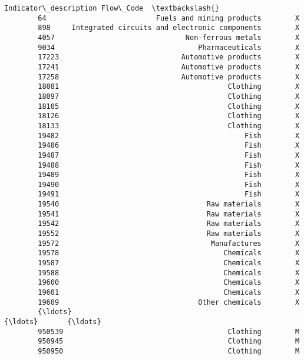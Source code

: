 \documentclass[11pt]{article}
\begin{document}
\begin{Verbatim}[commandchars=\\\{\}]
                                        Indicator\_description Flow\_Code  \textbackslash{}
        64                          Fuels and mining products        X    
        898     Integrated circuits and electronic components        X    
        4057                               Non-ferrous metals        X    
        9034                                  Pharmaceuticals        X    
        17223                             Automotive products        X    
        17241                             Automotive products        X    
        17258                             Automotive products        X    
        18081                                        Clothing        X    
        18097                                        Clothing        X    
        18105                                        Clothing        X    
        18126                                        Clothing        X    
        18133                                        Clothing        X    
        19482                                            Fish        X    
        19486                                            Fish        X    
        19487                                            Fish        X    
        19488                                            Fish        X    
        19489                                            Fish        X    
        19490                                            Fish        X    
        19491                                            Fish        X    
        19540                                   Raw materials        X    
        19541                                   Raw materials        X    
        19542                                   Raw materials        X    
        19552                                   Raw materials        X    
        19572                                    Manufactures        X    
        19578                                       Chemicals        X    
        19587                                       Chemicals        X    
        19588                                       Chemicals        X    
        19600                                       Chemicals        X    
        19601                                       Chemicals        X    
        19609                                 Other chemicals        X    
        {\ldots}                                               {\ldots}       {\ldots}   
        950539                                       Clothing        M    
        950945                                       Clothing        M    
        950950                                       Clothing        M    

\end{Verbatim}
\end{document}
